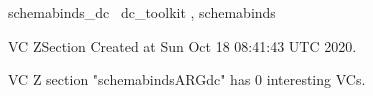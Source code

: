 \documentclass{article}
\begin{document}

\begin{zsection}	 \SECTION schemabinds\_dc \parents~dc\_toolkit , schemabinds
\end{zsection}

\newcommand{\appliesTo}{\zbinop{appliesTo}} 
\newcommand{\appliesToNofix}{\zpreop{appliesToNofix}} 

VC ZSection Created at Sun Oct 18 08:41:43 UTC 2020.



 VC Z section "schemabindsARGdc" has $0$ interesting VCs.



\end{document}
